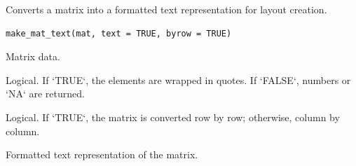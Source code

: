 \documentclass[a4paper]{book}
\begin{document}
%
\begin{Description}
Converts a matrix into a formatted text representation for layout creation.
\end{Description}
%
\begin{Usage}
\begin{verbatim}
make_mat_text(mat, text = TRUE, byrow = TRUE)
\end{verbatim}
\end{Usage}
%
\begin{Arguments}
\begin{ldescription}
\item[\code{mat}] Matrix data.

\item[\code{text}] Logical. If `TRUE`, the elements are wrapped in quotes. If `FALSE`, numbers or `NA` are returned.

\item[\code{byrow}] Logical. If `TRUE`, the matrix is converted row by row; otherwise, column by column.
\end{ldescription}
\end{Arguments}
%
\begin{Value}
Formatted text representation of the matrix.
\end{Value}
%
\end{document}
